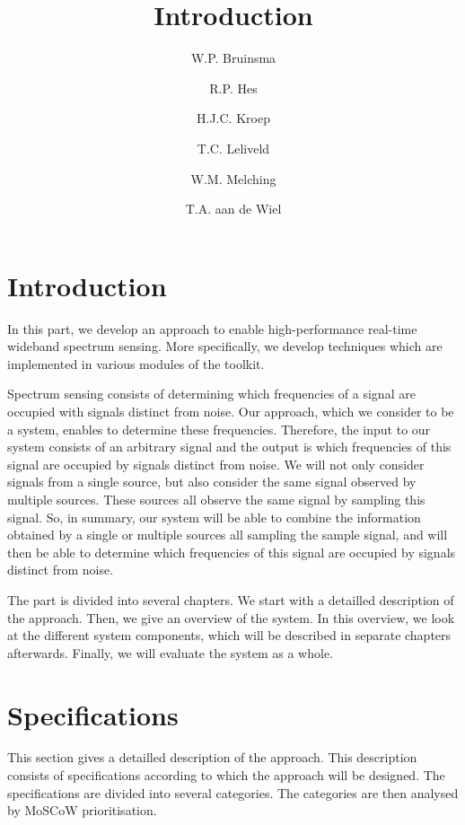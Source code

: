 \documentclass[a4paper, openany, oneside]{memoir}
\title{Introduction}
\author{W.P. Bruinsma \and R.P. Hes \and H.J.C. Kroep \and T.C. Leliveld \and W.M. Melching \and T.A. aan de Wiel}
\begin{document}
\section{Introduction}
In this part, we develop an approach to enable high-performance real-time wideband spectrum sensing. More specifically, we develop techniques which are implemented in various modules of the toolkit.

Spectrum sensing consists of determining which frequencies of a signal are occupied with signals distinct from noise. Our approach, which we consider to be a system, enables to determine these frequencies. Therefore, the input to our system consists of an arbitrary signal and the output is which frequencies of this signal are occupied by signals distinct from noise. We will not only consider signals from a single source, but also consider the same signal observed by multiple sources. These sources all observe the same signal by sampling this signal. So, in summary, our system will be able to combine the information obtained by a single or multiple sources all sampling the sample signal, and will then be able to determine which frequencies of this signal are occupied by signals distinct from noise. 

The part is divided into several chapters. We start with a detailled description of the approach. Then, we give an overview of the system. In this overview, we look at the different system components, which will be described in separate chapters afterwards. Finally, we will evaluate the system as a whole.

\section{Specifications}
\label{sec:theory-specs}
This section gives a detailled description of the approach. This description consists of specifications according to which the approach will be designed. The specifications are divided into several categories. The categories are then analysed by MoSCoW prioritisation.
\end{document}
